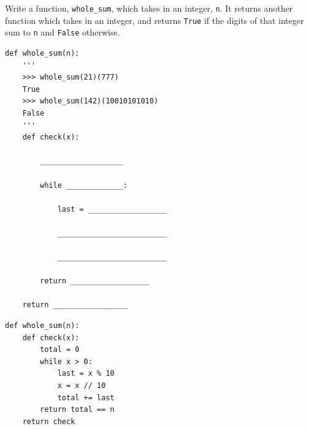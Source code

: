 \begin{blocksection}
\question Write a function, \lstinline{whole_sum}, which takes in an integer, \lstinline{n}. It returns another function which takes in an integer, and returns \lstinline{True} if the digits of that integer sum to \lstinline{n} and \lstinline{False} otherwise.

\begin{lstlisting}
def whole_sum(n): 
    ''' 
    >>> whole_sum(21)(777)
    True
    >>> whole_sum(142)(10010101010)
    False
    '''
    def check(x):

        ___________________
		
        while _____________:
		
            last = __________________
				
            _________________________
				
            _________________________
				
        return __________________
		
    return _________________

\end{lstlisting}

\begin{solution}
\begin{lstlisting}
def whole_sum(n):
    def check(x):
        total = 0
        while x > 0:
            last = x % 10
            x = x // 10
            total += last
        return total == n
    return check
\end{lstlisting}
\end{solution}
\end{blocksection}
